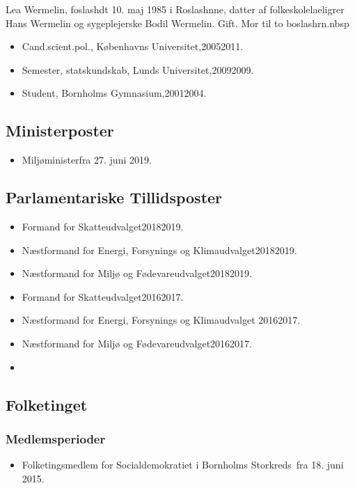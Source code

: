 \documentclass[11pt, a4paper]{awesome-cv}
\begin{document}
\makecvheader[R]
\makelettertitle
\begin{cvletter}
Lea Wermelin, foslashdt 10. maj 1985 i Roslashnne, datter af folkeskolelaeligrer Hans Wermelin og sygeplejerske Bodil Wermelin. Gift. Mor til to boslashrn.nbsp

\begin{itemize}
\item Cand.scient.pol., Københavns Universitet,20052011.
\item Semester, statskundskab, Lunds Universitet,20092009.
\item Student, Bornholms Gymnasium,20012004.
\end{itemize}
\subsection*{Ministerposter}
\begin{itemize}
\item Miljøministerfra 27. juni 2019.
\end{itemize}
\subsection*{Parlamentariske Tillidsposter}
\begin{itemize}
\item Formand for Skatteudvalget20182019.
\item Næstformand for Energi, Forsynings og Klimaudvalget20182019.
\item Næstformand for Miljø og Fødevareudvalget20182019.
\item Formand for Skatteudvalget20162017.
\item Næstformand for Energi, Forsynings og Klimaudvalget 20162017.
\item Næstformand for Miljø og Fødevareudvalget20162017.
\item 
\end{itemize}
\subsection*{Folketinget}
\subsubsection*{Medlemsperioder}
\begin{itemize}
\item Folketingsmedlem for Socialdemokratiet i Bornholms Storkreds fra 18. juni 2015.
\end{itemize}

\end{cvletter}
\end{document}
